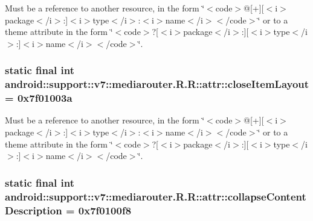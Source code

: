 Must be a reference to another resource, in the form \char`\"{}$<$code$>$@\mbox{[}+\mbox{]}\mbox{[}$<$i$>$package$<$/i$>$:\mbox{]}$<$i$>$type$<$/i$>$:$<$i$>$name$<$/i$>$$<$/code$>$\char`\"{} or to a theme attribute in the form \char`\"{}$<$code$>$?\mbox{[}$<$i$>$package$<$/i$>$:\mbox{]}\mbox{[}$<$i$>$type$<$/i$>$:\mbox{]}$<$i$>$name$<$/i$>$$<$/code$>$\char`\"{}. \hypertarget{classandroid_1_1support_1_1v7_1_1mediarouter_1_1_r_1_1attr_b36547976dee3cb254d558dbb9a6cdce}{
\subsubsection[{closeItemLayout}]{\setlength{\rightskip}{0pt plus 5cm}static final int android::support::v7::mediarouter.R.R::attr::closeItemLayout = 0x7f01003a}}
\label{classandroid_1_1support_1_1v7_1_1mediarouter_1_1_r_1_1attr_b36547976dee3cb254d558dbb9a6cdce}


Must be a reference to another resource, in the form \char`\"{}$<$code$>$@\mbox{[}+\mbox{]}\mbox{[}$<$i$>$package$<$/i$>$:\mbox{]}$<$i$>$type$<$/i$>$:$<$i$>$name$<$/i$>$$<$/code$>$\char`\"{} or to a theme attribute in the form \char`\"{}$<$code$>$?\mbox{[}$<$i$>$package$<$/i$>$:\mbox{]}\mbox{[}$<$i$>$type$<$/i$>$:\mbox{]}$<$i$>$name$<$/i$>$$<$/code$>$\char`\"{}. \hypertarget{classandroid_1_1support_1_1v7_1_1mediarouter_1_1_r_1_1attr_a7bf0ecd5e115a6f982d4415d283f16a}{
\subsubsection[{collapseContentDescription}]{\setlength{\rightskip}{0pt plus 5cm}static final int android::support::v7::mediarouter.R.R::attr::collapseContentDescription = 0x7f0100f8}}
\label{classandroid_1_1support_1_1v7_1_1mediarouter_1_1_r_1_1attr_a7bf0ecd5e115a6f982d4415d283f16a}


